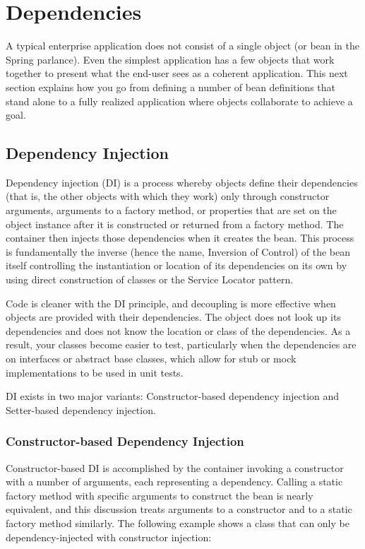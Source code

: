 \section{Dependencies}
A typical enterprise application does not consist of a single object (or bean in the Spring parlance).
Even the simplest application has a few objects that work together to present what the end-user
sees as a coherent application. This next section explains how you go from defining a number of
bean definitions that stand alone to a fully realized application where objects collaborate to achieve
a goal.

\subsection{Dependency Injection}
Dependency injection (DI) is a process whereby objects define their dependencies (that is, the other
objects with which they work) only through constructor arguments, arguments to a factory method,
or properties that are set on the object instance after it is constructed or returned from a factory
method. The container then injects those dependencies when it creates the bean. This process is
fundamentally the inverse (hence the name, Inversion of Control) of the bean itself controlling the
instantiation or location of its dependencies on its own by using direct construction of classes or the
Service Locator pattern.

Code is cleaner with the DI principle, and decoupling is more effective when objects are provided
with their dependencies. The object does not look up its dependencies and does not know the
location or class of the dependencies. As a result, your classes become easier to test, particularly
when the dependencies are on interfaces or abstract base classes, which allow for stub or mock
implementations to be used in unit tests.

DI exists in two major variants: Constructor-based dependency injection and Setter-based
dependency injection.

\subsubsection{Constructor-based Dependency Injection}
Constructor-based DI is accomplished by the container invoking a constructor with a number of
arguments, each representing a dependency. Calling a static factory method with specific
arguments to construct the bean is nearly equivalent, and this discussion treats arguments to a
constructor and to a static factory method similarly. The following example shows a class that can
only be dependency-injected with constructor injection:

